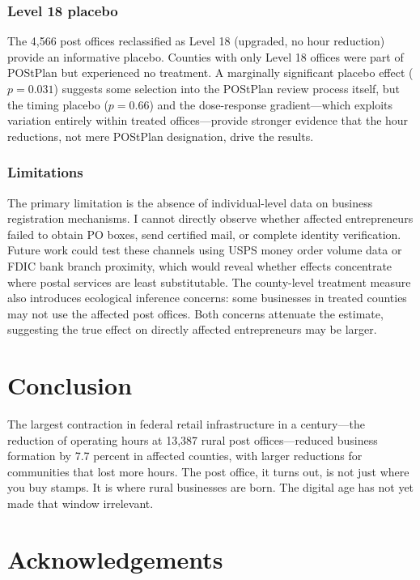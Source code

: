 \documentclass[12pt]{article}
\begin{document}
\subsubsection*{Level 18 placebo} The 4,566 post offices reclassified as Level 18 (upgraded, no hour reduction) provide an informative placebo. Counties with only Level 18 offices were part of POStPlan but experienced no treatment. A marginally significant placebo effect ($p = 0.031$) suggests some selection into the POStPlan review process itself, but the timing placebo ($p = 0.66$) and the dose-response gradient---which exploits variation entirely within treated offices---provide stronger evidence that the hour reductions, not mere POStPlan designation, drive the results.

\subsubsection*{Limitations} The primary limitation is the absence of individual-level data on business registration mechanisms. I cannot directly observe whether affected entrepreneurs failed to obtain PO boxes, send certified mail, or complete identity verification. Future work could test these channels using USPS money order volume data or FDIC bank branch proximity, which would reveal whether effects concentrate where postal services are least substitutable. The county-level treatment measure also introduces ecological inference concerns: some businesses in treated counties may not use the affected post offices. Both concerns attenuate the estimate, suggesting the true effect on directly affected entrepreneurs may be larger.

\section{Conclusion}

The largest contraction in federal retail infrastructure in a century---the reduction of operating hours at 13,387 rural post offices---reduced business formation by 7.7 percent in affected counties, with larger reductions for communities that lost more hours. The post office, it turns out, is not just where you buy stamps. It is where rural businesses are born. The digital age has not yet made that window irrelevant.

\section*{Acknowledgements}
\end{document}
